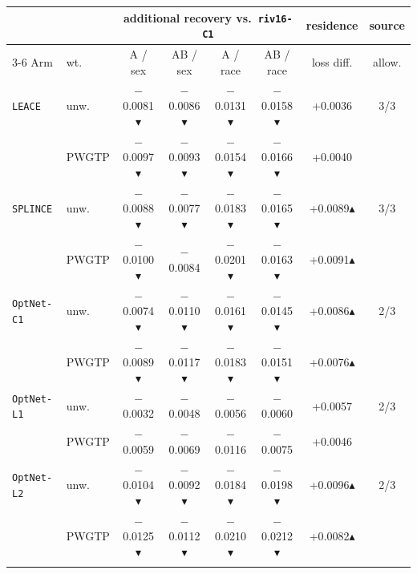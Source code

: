 \begin{tabular}{@{}llcccccc@{}}
\toprule
& & \multicolumn{4}{c}{additional recovery vs.\ \texttt{riv16-C1}} & residence & source \\
\cmidrule(lr){3-6}
Arm & wt. & A / sex & AB / sex & A / race & AB / race & loss diff. & allow. \\
\midrule
\texttt{LEACE} & unw. & $-$0.0081$\blacktriangledown$ & $-$0.0086$\blacktriangledown$ & $-$0.0131$\blacktriangledown$ & $-$0.0158$\blacktriangledown$ & +0.0036 & 3/3 \\
 & PWGTP & $-$0.0097$\blacktriangledown$ & $-$0.0093$\blacktriangledown$ & $-$0.0154$\blacktriangledown$ & $-$0.0166$\blacktriangledown$ & +0.0040 &  \\
\addlinespace[1pt]
\texttt{SPLINCE} & unw. & $-$0.0088$\blacktriangledown$ & $-$0.0077$\blacktriangledown$ & $-$0.0183$\blacktriangledown$ & $-$0.0165$\blacktriangledown$ & +0.0089$\blacktriangle$ & 3/3 \\
 & PWGTP & $-$0.0100$\blacktriangledown$ & $-$0.0084 & $-$0.0201$\blacktriangledown$ & $-$0.0163$\blacktriangledown$ & +0.0091$\blacktriangle$ &  \\
\addlinespace[1pt]
\texttt{OptNet-C1} & unw. & $-$0.0074$\blacktriangledown$ & $-$0.0110$\blacktriangledown$ & $-$0.0161$\blacktriangledown$ & $-$0.0145$\blacktriangledown$ & +0.0086$\blacktriangle$ & 2/3 \\
 & PWGTP & $-$0.0089$\blacktriangledown$ & $-$0.0117$\blacktriangledown$ & $-$0.0183$\blacktriangledown$ & $-$0.0151$\blacktriangledown$ & +0.0076$\blacktriangle$ &  \\
\addlinespace[1pt]
\texttt{OptNet-L1} & unw. & $-$0.0032 & $-$0.0048 & $-$0.0056 & $-$0.0060 & +0.0057 & 2/3 \\
 & PWGTP & $-$0.0059 & $-$0.0069 & $-$0.0116 & $-$0.0075 & +0.0046 &  \\
\addlinespace[1pt]
\texttt{OptNet-L2} & unw. & $-$0.0104$\blacktriangledown$ & $-$0.0092$\blacktriangledown$ & $-$0.0184$\blacktriangledown$ & $-$0.0198$\blacktriangledown$ & +0.0096$\blacktriangle$ & 2/3 \\
 & PWGTP & $-$0.0125$\blacktriangledown$ & $-$0.0112$\blacktriangledown$ & $-$0.0210$\blacktriangledown$ & $-$0.0212$\blacktriangledown$ & +0.0082$\blacktriangle$ &  \\
\addlinespace[1pt]
\bottomrule
\end{tabular}
